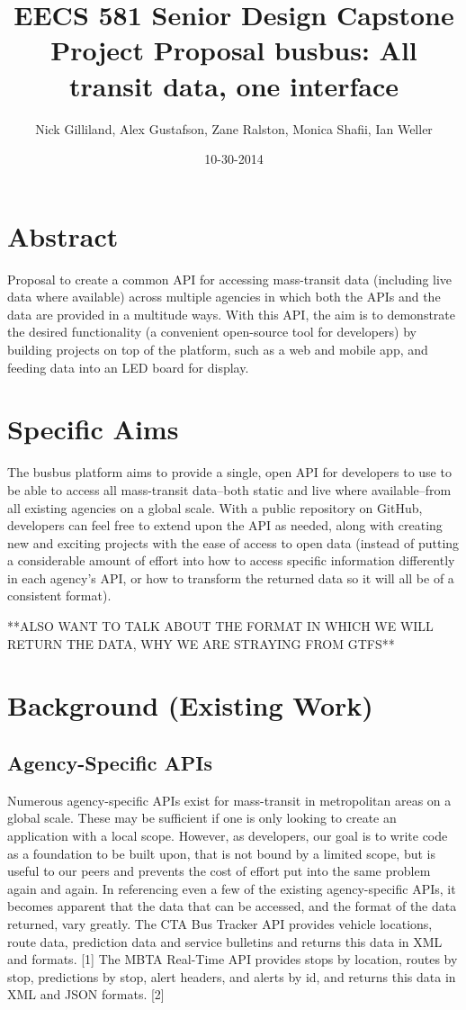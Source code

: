 \documentclass[12pt]{article}
\title{EECS 581 Senior Design Capstone Project Proposal
busbus: All transit data, one interface}
\author{Nick Gilliland, Alex Gustafson, Zane Ralston, Monica Shafii, Ian Weller}
\date{10-30-2014}
\begin{document}
\maketitle

\section{Abstract}

Proposal to create a common API for accessing mass-transit data (including live data where available)
across multiple agencies in which both the APIs and the data are provided in a multitude ways. 
With this API, the aim is to demonstrate the desired functionality (a convenient open-source tool 
for developers) by building projects on top of the platform, such as a web and mobile app, and 
feeding data into an LED board for display.

\section{Specific Aims}

The busbus platform aims to provide a single, open API for developers to use to be able to access all
mass-transit data--both static and live where available--from all existing agencies on a global scale. 
With a public repository on GitHub, developers can feel free to extend upon the API as needed,
along with creating new and exciting projects with the ease of access to open data (instead of 
putting a considerable amount of effort into how to access specific information differently in each 
agency's API, or how to transform the returned data so it will all be of a consistent format).

**ALSO WANT TO TALK ABOUT THE FORMAT IN WHICH WE WILL RETURN THE DATA, WHY WE
ARE STRAYING FROM GTFS**

\section{Background (Existing Work)}
\subsection{Agency-Specific APIs}

Numerous agency-specific APIs exist for mass-transit in metropolitan areas on a global scale.
These may be sufficient if one is only looking to create an application with a local scope. However,
as developers, our goal is to write code as a foundation to be built upon, that is not bound by a
limited scope, but is useful to our peers and prevents the cost of effort put into the same 
problem again and again. In referencing even a few of the existing agency-specific APIs, it
becomes apparent that the data that can be accessed, and the format of the data returned, 
vary greatly. The CTA Bus Tracker API provides vehicle locations, route data, prediction data and 
service bulletins and returns this data in XML and formats. [1] The MBTA Real-Time API provides 
stops by location, routes by stop, predictions by stop, alert headers, and alerts by id, and returns 
this data in XML and JSON formats. [2] 
\end{document}
